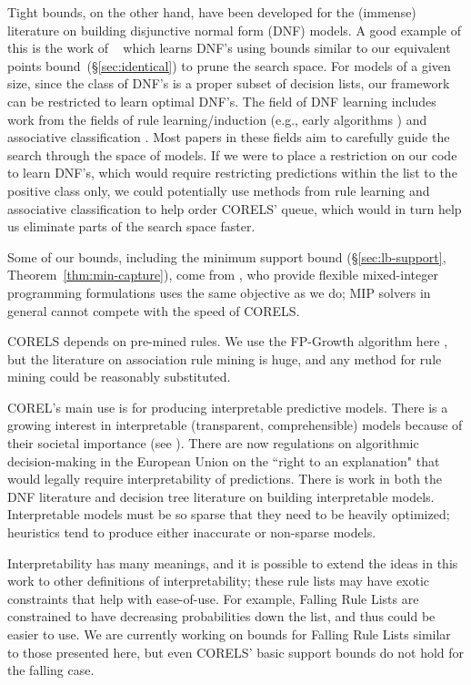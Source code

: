Tight bounds, on the other hand, have been developed for the (immense) literature on building disjunctive normal form (DNF) models. A good example of this is the work of ~\citet{Rijnbeek10} which learns DNF's using bounds similar to our equivalent points bound~(\S\ref{sec:identical}) to prune the search space.  For models of a given size, since the class of DNF's is a proper subset of decision lists, our framework can be restricted to learn optimal DNF's. The field of DNF learning includes work from the fields of rule learning/induction (e.g., early algorithms \citep{Michalski1969,ClarkNiblett1989,Frank1998}) and associative classification \citep{Vanhoof10}. Most papers in these fields aim to carefully guide the search through the space of models. If we were to place a restriction on our code to learn DNF's, which would require restricting predictions within the list to the positive class only, we could potentially use methods from rule learning and associative classification to help order CORELS' queue, which would in turn help us eliminate parts of the search space faster. 

Some of our bounds, including the minimum support bound (\S\ref{sec:lb-support}, Theorem~\ref{thm:min-capture}), come from \citep{RudinEr15}, who provide flexible mixed-integer programming formulations uses the same objective as we do; MIP solvers in general cannot compete with the speed of CORELS.

CORELS depends on pre-mined rules. We use the FP-Growth algorithm here \cite{FP}, but the literature on association rule mining is huge, and any method for rule mining could be reasonably substituted.

COREL's main use is for producing interpretable predictive models. There is a growing interest in interpretable (transparent, comprehensible) models because of their societal importance (see \citep{ruping2006learning,bratko1997machine,dawes1979robust,VellidoEtAl12,Giraud98,Holte93,Schmueli10,Huysmans11,Freitas14}). There are now regulations on algorithmic decision-making in the European Union on the ``right to an explanation" \citep{Goodman2016EU} that would legally require interpretability of predictions. There is work in both the DNF literature \citep{Ruckert}and decision tree literature \cite{GarofalakisHyRaSh00} on building interpretable models. Interpretable models must be so sparse that they need to be heavily optimized; heuristics tend to produce either inaccurate or non-sparse models.

Interpretability has many meanings, and it is possible to extend the ideas in this work to other definitions of interpretability; these rule lists may have exotic constraints that help with ease-of-use. For example, Falling Rule Lists \citep{WangRu15} are constrained to have decreasing probabilities down the list, and thus could be easier to use. We are currently working on bounds for Falling Rule Lists \citep{ChenRu17} similar to those presented here, but even CORELS' basic support bounds do not hold for the falling case. 

